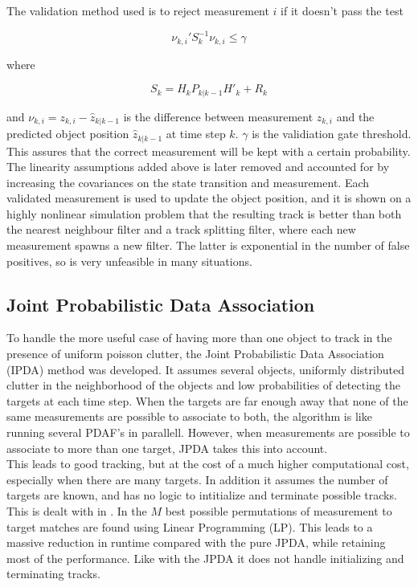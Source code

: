 The validation method used is to reject measurement $i$ if it doesn't pass the test

\begin{equation}
    \nu_{k,i}'S_k^{-1}\nu_{k,i} \leq \gamma
\end{equation}

where 

\begin{equation}
    S_k = H_kP_{k|k-1}H'_k+R_k
\end{equation}

and $\nu_{k,i} = z_{k,i} - \hat{z}_{k|k-1}$ is the difference between measurement $z_{k,i}$ and the predicted object position $\hat{z}_{k|k-1}$ at time step $k$. $\gamma$ is the validiation gate threshold. This assures that the correct measurement will be kept with a certain probability. \\

The linearity assumptions added above is later removed and accounted for by increasing the covariances on the state transition and measurement. Each validated measurement is used to update the object position, and it is shown on a highly nonlinear simulation problem that the resulting track is better than both the nearest neighbour filter and a track splitting filter, where each new measurement spawns a new filter. The latter is exponential in the number of false positives, so is very unfeasible in many situations. 

\subsection{Joint Probabilistic Data Association}

To handle the more useful case of having more than one object to track in the presence of uniform poisson clutter, the Joint Probabilistic Data Association (IPDA) method was developed\cite{JPDA}. It assumes several objects, uniformly distributed clutter in the neighborhood of the objects and low probabilities of detecting the targets at each time step. When the targets are far enough away that none of the same measurements are possible to associate to both, the algorithm is like running several PDAF's in parallell. However, when measurements are possible to associate to more than one target, JPDA takes this into account. \\ 

This leads to good tracking, but at the cost of a much higher computational cost, especially when there are many targets. In addition it assumes the number of targets are known, and has no logic to intitialize and terminate possible tracks. This is dealt with in \cite{Multitrack}. In \cite{JPDARev} the $M$ best possible permutations of measurement to target matches are found using Linear Programming (LP). This leads to a massive reduction in runtime compared with the pure JPDA, while retaining most of the performance. Like with the JPDA it does not handle initializing and terminating tracks. \\

